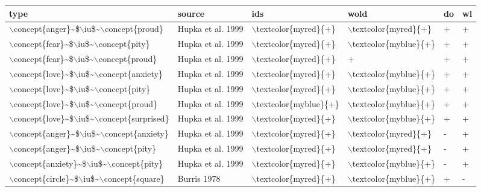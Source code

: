 \begin{longtable}{llllll}
  \hline
type & source & ids & wold & do & wl \\ 
  \hline
$\backslash$concept\{anger\}\~{}\$$\backslash$iu\$\~{}$\backslash$concept\{proud\} & Hupka et al. 1999 & $\backslash$textcolor\{myred\}\{+\} & $\backslash$textcolor\{myred\}\{+\} & + & + \\ 
  $\backslash$concept\{fear\}\~{}\$$\backslash$iu\$\~{}$\backslash$concept\{pity\} & Hupka et al. 1999 & $\backslash$textcolor\{myred\}\{+\} & $\backslash$textcolor\{myblue\}\{+\} & + & + \\ 
  $\backslash$concept\{fear\}\~{}\$$\backslash$iu\$\~{}$\backslash$concept\{proud\} & Hupka et al. 1999 & $\backslash$textcolor\{myred\}\{+\} & + & + & + \\ 
  $\backslash$concept\{love\}\~{}\$$\backslash$iu\$\~{}$\backslash$concept\{anxiety\} & Hupka et al. 1999 & $\backslash$textcolor\{myred\}\{+\} & $\backslash$textcolor\{myblue\}\{+\} & + & + \\ 
  $\backslash$concept\{love\}\~{}\$$\backslash$iu\$\~{}$\backslash$concept\{pity\} & Hupka et al. 1999 & $\backslash$textcolor\{myred\}\{+\} & $\backslash$textcolor\{myblue\}\{+\} & + & + \\ 
  $\backslash$concept\{love\}\~{}\$$\backslash$iu\$\~{}$\backslash$concept\{proud\} & Hupka et al. 1999 & $\backslash$textcolor\{myblue\}\{+\} & $\backslash$textcolor\{myblue\}\{+\} & + & + \\ 
  $\backslash$concept\{love\}\~{}\$$\backslash$iu\$\~{}$\backslash$concept\{surprised\} & Hupka et al. 1999 & $\backslash$textcolor\{myred\}\{+\} & $\backslash$textcolor\{myblue\}\{+\} & + & + \\ 
  $\backslash$concept\{anger\}\~{}\$$\backslash$iu\$\~{}$\backslash$concept\{anxiety\} & Hupka et al. 1999 & $\backslash$textcolor\{myred\}\{+\} & $\backslash$textcolor\{myred\}\{+\} & - & + \\ 
  $\backslash$concept\{anger\}\~{}\$$\backslash$iu\$\~{}$\backslash$concept\{pity\} & Hupka et al. 1999 & $\backslash$textcolor\{myred\}\{+\} & $\backslash$textcolor\{myred\}\{+\} & - & + \\ 
  $\backslash$concept\{anxiety\}\~{}\$$\backslash$iu\$\~{}$\backslash$concept\{pity\} & Hupka et al. 1999 & $\backslash$textcolor\{myred\}\{+\} & $\backslash$textcolor\{myblue\}\{+\} & - & + \\ 
  $\backslash$concept\{circle\}\~{}\$$\backslash$iu\$\~{}$\backslash$concept\{square\} & Burris 1978 & $\backslash$textcolor\{myred\}\{+\} & $\backslash$textcolor\{myblue\}\{+\} & + & - \\ 

\end{longtable}
